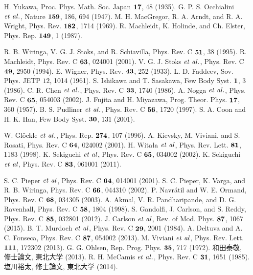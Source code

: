 \documentclass[12pt,a4j,openany,report]{jsbook}
\begin{document}
\begin{thebibliography}{99}

 H. Yukawa, Proc. Phys. Math. Soc. Japan $\bf 17$, 48 (1935).
 G. P. S. Occhialini $\it et~al.$, Nature $\bf 159$, 186, 694 (1947).
 M. H. MacGregor, R. A. Arndt, and R. A. Wright, Phys. Rev.  $\bf 182$, 1714 (1969).
 R. Machleidt, K. Holinde, and Ch. Elster, Phys. Rep. $\bf 149$, 1 (1987).
 
 R. B. Wiringa, V. G. J. Stoks, and R. Schiavilla, Phys. Rev. C $\bf 51$, 38 (1995).
 R. Machleidt, Phys. Rev. C $\bf 63$, 024001 (2001).
 V. G. J. Stoks $\it et~al.$, Phys. Rev. C $\bf 49$, 2950 (1994).
 E. Wigner, Phys. Rev. $\bf 43$, 252 (1933).
 L. D. Faddeev, Sov. Phys. JETP $12$, 1014 (1961).
 S. Ishikawa and T. Sasakawa, Few Body Syst. $\bf 1$, 3 (1986).
 C. R. Chen $\it et~al.$, Phys. Rev. C $\bf 33$, 1740 (1986).
 A. Nogga $\it et~al.$, Phys. Rev. C $\bf 65$, 054003 (2002).
 J. Fujita and H. Miyazawa, Prog. Theor. Phys. $\bf 17$, 360 (1957).
 B. S. Pudliner $\it et~al.$, Phys. Rev. C $\bf 56$, 1720 (1997).
 S. A. Coon and H. K. Han, Few Body Syst. $\bf 30$, 131 (2001).
 
 W. Gl\"{o}ckle $\it et~al.$, Phys. Rep. $\bf 274$, 107 (1996).
 A. Kievsky, M. Viviani, and S. Rosati, Phys. Rev. C $\bf 64$, 024002 (2001).
 H. Wita{\l}a $\it et~al$, Phys. Rev. Lett. $\bf 81$, 1183 (1998).
 K. Sekiguchi $\it et~al$, Phys. Rev. C $\bf 65$, 034002 (2002).
 K. Sekiguchi $\it et~al$, Phys. Rev. C $\bf 83$, 061001 (2011).
 
 S. C. Pieper $\it et~al$, Phys. Rev. C $\bf 64$, 014001 (2001).
 S. C. Pieper, K. Varga, and R. B. Wiringa, Phys. Rev. C $\bf 66$, 044310 (2002).
 P. Navr\'{a}til and W. E. Ormand, Phys. Rev. C $\bf 68$, 034305 (2003).
 A. Akmal, V. R. Pandharipande, and D. G. Ravenhall, Phys. Rev. C $\bf 58$, 1804 (1998).
 S. Gandolfi, J. Carlson, and S. Reddy, Phys. Rev. C $\bf 85$, 032801 (2012).
 J. Carlson $\it et~al$, Rev. of Mod. Phys. $\bf 87$, 1067 (2015).
 B. T. Murdoch $\it et~al$, Phys. Rev. C $\bf 29$, 2001 (1984).
 A. Deltuva and A. C. Fonseca, Phys. Rev. C $\bf 87$, 054002 (2013).
 M. Viviani $\it et~al$, Phys. Rev. Lett. $\bf 111$, 172302 (2013).
 G. G. Ohlsen, Rep. Prog. Phys. $\bf 35$, 717 (1972).
 和田泰敬, 修士論文, 東北大学 (2013).
 R. H. McCamis $\it et~al.$, Phys. Rev. C $\bf 31$, 1651 (1985). 
 塩川裕太, 修士論文, 東北大学 (2014).
 

\end{thebibliography}
\end{document}
